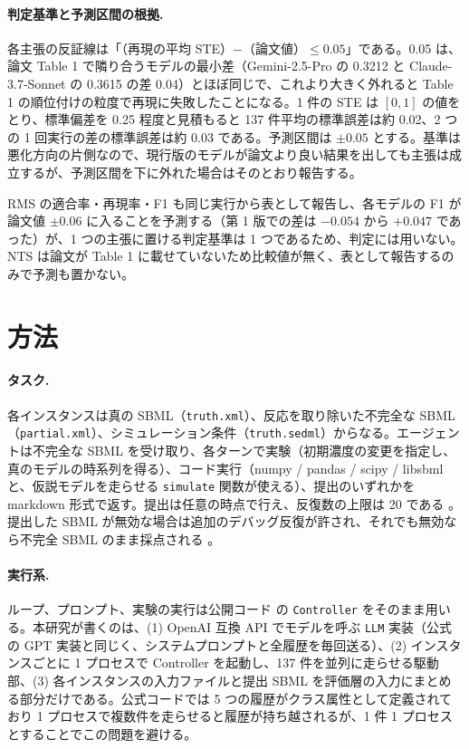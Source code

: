 \documentclass{article}
\providecommand{\unverified}[1]{#1}
\begin{document}


\paragraph{判定基準と予測区間の根拠.}
各主張の反証線は「（再現の平均 STE）$-$（論文値）$\le 0.05$」である。0.05 は、論文 Table 1 で隣り合うモデルの最小差（Gemini-2.5-Pro の \unverified{0.3212} と Claude-3.7-Sonnet の \unverified{0.3615} の差 \unverified{0.04}）とほぼ同じで、これより大きく外れると Table 1 の順位付けの粒度で再現に失敗したことになる。1 件の STE は $[0, 1]$ の値をとり、標準偏差を 0.25 程度と見積もると 137 件平均の標準誤差は約 0.02、2 つの 1 回実行の差の標準誤差は約 0.03 である。予測区間は $\pm 0.05$ とする。基準は悪化方向の片側なので、現行版のモデルが論文より良い結果を出しても主張は成立するが、予測区間を下に外れた場合はそのとおり報告する。

RMS の適合率・再現率・F1 も同じ実行から表として報告し、各モデルの F1 が論文値 $\pm 0.06$ に入ることを予測する（第 1 版での差は $-0.054$ から $+0.047$ であった）が、1 つの主張に置ける判定基準は 1 つであるため、判定には用いない。NTS は論文が Table 1 に載せていないため比較値が無く、表として報告するのみで予測も置かない。

\section{方法}
\label{sec:method}
\paragraph{タスク.}
各インスタンスは真の SBML（\texttt{truth.xml}）、反応を取り除いた不完全な SBML（\texttt{partial.xml}）、シミュレーション条件（\texttt{truth.sedml}）からなる。エージェントは不完全な SBML を受け取り、各ターンで実験（初期濃度の変更を指定し、真のモデルの時系列を得る）、コード実行（numpy / pandas / scipy / libsbml と、仮説モデルを走らせる \texttt{simulate} 関数が使える）、提出のいずれかを markdown 形式で返す。提出は任意の時点で行え、反復数の上限は 20 である \cite[s1.p3]{duan-2025-measuring}。提出した SBML が無効な場合は追加のデバッグ反復が許され、それでも無効なら不完全 SBML のまま採点される \cite[s1.p4]{duan-2025-measuring}。

\paragraph{実行系.}
ループ、プロンプト、実験の実行は公開コード \citep{h4duan-2025-scigym} の \texttt{Controller} をそのまま用いる。本研究が書くのは、(1) OpenAI 互換 API でモデルを呼ぶ \texttt{LLM} 実装（公式の GPT 実装と同じく、システムプロンプトと全履歴を毎回送る）、(2) インスタンスごとに 1 プロセスで Controller を起動し、137 件を並列に走らせる駆動部、(3) 各インスタンスの入力ファイルと提出 SBML を評価層の入力にまとめる部分だけである。公式コードでは 5 つの履歴がクラス属性として定義されており 1 プロセスで複数件を走らせると履歴が持ち越されるが、1 件 1 プロセスとすることでこの問題を避ける。
\end{document}
